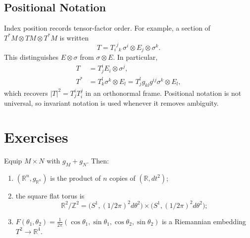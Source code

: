 \subsection{Positional Notation}

\begin{remark}
  \label{rem:pet-ch1-positional-notation}


  Index position records tensor-factor order. For example, a section of
  $T^*M\otimes TM\otimes T^*M$ is written
  \[
    T={T_i}^j{}_k\,\sigma^i\otimes E_j\otimes\sigma^k.
  \]
  This distinguishes $E\otimes\sigma$ from $\sigma\otimes E$. In particular,
  \[
  \begin{aligned}
    T&=T^i_jE_i\otimes\sigma^j,\\
    T^*&=T^l_k\sigma^k\otimes E_l
       =T^l_jg_{kl}g^{ij}\sigma^k\otimes E_l,
  \end{aligned}
  \]
  which recovers $|T|^2=T^i_jT^j_i$ in an orthonormal frame. Positional
  notation is not universal, so invariant notation is used whenever it
  removes ambiguity.
\end{remark}

\section{Exercises}

\begin{remark}
  \label{rem:pet-ch1-ex-1}


  Equip $M\times N$ with $g_M+g_N$. Then:
  \begin{enumerate}
    \item $(\mathbb{R}^n,g_{\mathbb{R}^n})$ is the product of $n$ copies of
      $(\mathbb{R},dt^2)$;
    \item the square flat torus is
      \[
        \mathbb{R}^2/\mathbb{Z}^2
          =\big(S^1,(1/2\pi)^2d\theta^2\big)
             \times\big(S^1,(1/2\pi)^2d\theta^2\big);
      \]
    \item
      $F(\theta_1,\theta_2)=\frac1{2\pi}
        (\cos\theta_1,\sin\theta_1,\cos\theta_2,\sin\theta_2)$
      is a Riemannian embedding $T^2\to\mathbb{R}^4$.
  \end{enumerate}
\end{remark}

